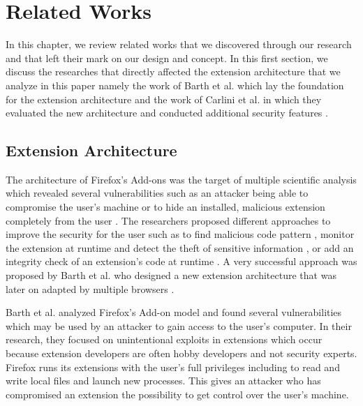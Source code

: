 
\chapter{Related Works}

	In this chapter, we review related works that we discovered through our research and that left their mark on our design and concept. In this first section, we discuss the researches that directly affected the extension architecture that we analyze in this paper namely the work of Barth et al. which lay the foundation for the extension architecture and the work of Carlini et al. in which they evaluated the new architecture and conducted additional security features \cite{Barth10protectingbrowsers, Carlini:2012:EGC:2362793.2362800}. 



\section{Extension Architecture} %

	The architecture of Firefox's Add-ons was the target of multiple scientific analysis which revealed several vulnerabilities such as an attacker being able to compromise the user's machine or to hide an installed, malicious extension completely from the user \cite{Bandhakavi:2011:VBE:1995376.1995398, TerLouw:2007:EWB:1420581.1420583}. The researchers proposed different approaches to improve the security for the user such as to find malicious code pattern \cite{Bandhakavi:2011:VBE:1995376.1995398}, monitor the extension at runtime and detect the theft of sensitive information \cite{Dhawan:2009:AIF:1723192.1723250, cs2015sentinel, TerLouw:2007:EWB:1420581.1420583}, or add an integrity check of an extension's code at runtime \cite{TerLouw:2007:EWB:1420581.1420583}. A very successful approach was proposed by Barth et al. who designed a new extension architecture that was later on adapted by multiple browsers \cite{Barth10protectingbrowsers}. 
	
	Barth et al. analyzed Firefox's Add-on model and found several vulnerabilities which may be used by an attacker to gain access to the user's computer. In their research, they focused on unintentional exploits in extensions which occur because extension developers are often hobby developers and not security experts. Firefox runs its extensions with the user's full privileges including to read and write local files and launch new processes. This gives an attacker who has compromised an extension the possibility to get control over the user's machine. 
	
